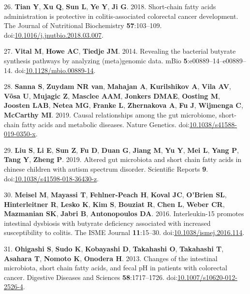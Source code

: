 \documentclass[11pt,]{article}
\begin{document}
\leavevmode\hypertarget{ref-Tian2018}{}%
26. \textbf{Tian Y}, \textbf{Xu Q}, \textbf{Sun L}, \textbf{Ye Y},
\textbf{Ji G}. 2018. Short-chain fatty acids administration is
protective in colitis-associated colorectal cancer development. The
Journal of Nutritional Biochemistry \textbf{57}:103--109.
doi:\href{https://doi.org/10.1016/j.jnutbio.2018.03.007}{10.1016/j.jnutbio.2018.03.007}.

\leavevmode\hypertarget{ref-Vital2014}{}%
27. \textbf{Vital M}, \textbf{Howe AC}, \textbf{Tiedje JM}. 2014.
Revealing the bacterial butyrate synthesis pathways by analyzing
(meta)genomic data. mBio \textbf{5}:e00889--14--e00889--14.
doi:\href{https://doi.org/10.1128/mbio.00889-14}{10.1128/mbio.00889-14}.

\leavevmode\hypertarget{ref-Sanna2019}{}%
28. \textbf{Sanna S}, \textbf{Zuydam NR van}, \textbf{Mahajan A},
\textbf{Kurilshikov A}, \textbf{Vila AV}, \textbf{Võsa U},
\textbf{Mujagic Z}, \textbf{Masclee AAM}, \textbf{Jonkers DMAE},
\textbf{Oosting M}, \textbf{Joosten LAB}, \textbf{Netea MG},
\textbf{Franke L}, \textbf{Zhernakova A}, \textbf{Fu J},
\textbf{Wijmenga C}, \textbf{McCarthy MI}. 2019. Causal relationships
among the gut microbiome, short-chain fatty acids and metabolic
diseases. Nature Genetics.
doi:\href{https://doi.org/10.1038/s41588-019-0350-x}{10.1038/s41588-019-0350-x}.

\leavevmode\hypertarget{ref-Liu2019}{}%
29. \textbf{Liu S}, \textbf{Li E}, \textbf{Sun Z}, \textbf{Fu D},
\textbf{Duan G}, \textbf{Jiang M}, \textbf{Yu Y}, \textbf{Mei L},
\textbf{Yang P}, \textbf{Tang Y}, \textbf{Zheng P}. 2019. Altered gut
microbiota and short chain fatty acids in chinese children with autism
spectrum disorder. Scientific Reports \textbf{9}.
doi:\href{https://doi.org/10.1038/s41598-018-36430-z}{10.1038/s41598-018-36430-z}.

\leavevmode\hypertarget{ref-Meisel2016}{}%
30. \textbf{Meisel M}, \textbf{Mayassi T}, \textbf{Fehlner-Peach H},
\textbf{Koval JC}, \textbf{O'Brien SL}, \textbf{Hinterleitner R},
\textbf{Lesko K}, \textbf{Kim S}, \textbf{Bouziat R}, \textbf{Chen L},
\textbf{Weber CR}, \textbf{Mazmanian SK}, \textbf{Jabri B},
\textbf{Antonopoulos DA}. 2016. Interleukin-15 promotes intestinal
dysbiosis with butyrate deficiency associated with increased
susceptibility to colitis. The ISME Journal \textbf{11}:15--30.
doi:\href{https://doi.org/10.1038/ismej.2016.114}{10.1038/ismej.2016.114}.

\leavevmode\hypertarget{ref-Ohigashi2013}{}%
31. \textbf{Ohigashi S}, \textbf{Sudo K}, \textbf{Kobayashi D},
\textbf{Takahashi O}, \textbf{Takahashi T}, \textbf{Asahara T},
\textbf{Nomoto K}, \textbf{Onodera H}. 2013. Changes of the intestinal
microbiota, short chain fatty acids, and fecal pH in patients with
colorectal cancer. Digestive Diseases and Sciences
\textbf{58}:1717--1726.
doi:\href{https://doi.org/10.1007/s10620-012-2526-4}{10.1007/s10620-012-2526-4}.
\end{document}
